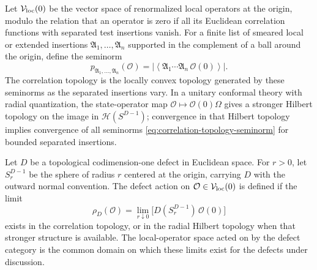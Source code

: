 \begin{definition}
\label{def:correlation-topology-local-operators}
Let \(\mathcal V_{\rm loc}(0)\) be the vector space of renormalized local
operators at the origin, modulo the relation that an operator is zero if all
its Euclidean correlation functions with separated test insertions vanish.
For a finite list of smeared local or extended insertions
\(\mathfrak A_1,\ldots,\mathfrak A_n\) supported in the complement of a ball
around the origin, define the seminorm
\begin{equation}
  p_{\mathfrak A_1,\ldots,\mathfrak A_n}(\mathcal O)
  =
  \left|
  \left\langle
    \mathfrak A_1\cdots \mathfrak A_n\,\mathcal O(0)
  \right\rangle
  \right| .
  \label{eq:correlation-topology-seminorm}
\end{equation}
The correlation topology is the locally convex topology generated by these
seminorms as the separated insertions vary.  In a unitary conformal theory
with radial quantization, the state-operator map
\(\mathcal O\mapsto\mathcal O(0)\Omega\) gives a stronger Hilbert topology on
the image in \(\mathcal H(S^{D-1})\); convergence in that Hilbert topology
implies convergence of all seminorms \eqref{eq:correlation-topology-seminorm}
for bounded separated insertions.
\end{definition}

\begin{definition}
\label{def:defect-action-on-local-operators}
Let \(D\) be a topological codimension-one defect in Euclidean space.  For
\(r>0\), let \(S_r^{D-1}\) be the sphere of radius \(r\) centered at the
origin, carrying \(D\) with the outward normal convention.  The defect action
on \(\mathcal O\in\mathcal V_{\rm loc}(0)\) is defined if the limit
\begin{equation}
  \rho_D(\mathcal O)
  =
  \lim_{r\downarrow0}
  \bigl[D(S_r^{D-1})\,\mathcal O(0)\bigr]
  \label{eq:defect-action-shrinking-limit}
\end{equation}
exists in the correlation topology, or in the radial Hilbert topology when
that stronger structure is available.  The local-operator space acted on by
the defect category is the common domain on which these limits exist for the
defects under discussion.
\end{definition}

